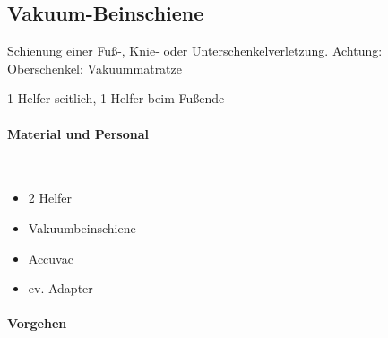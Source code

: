 \subsection{Vakuum-Beinschiene}
\label{topic:vacuumbeinschiene-anwendung}

Schienung einer Fuß-, Knie- oder Unterschenkelverletzung. Achtung:
Oberschenkel: Vakuummatratze

1 Helfer seitlich, 1 Helfer beim Fußende


\paragraph*{Material und Personal}~

\begin{itemize}
    \item 2 Helfer
    \item Vakuumbeinschiene
    \item Accuvac
    \item ev. Adapter
\end{itemize}


\paragraph*{Vorgehen}~

